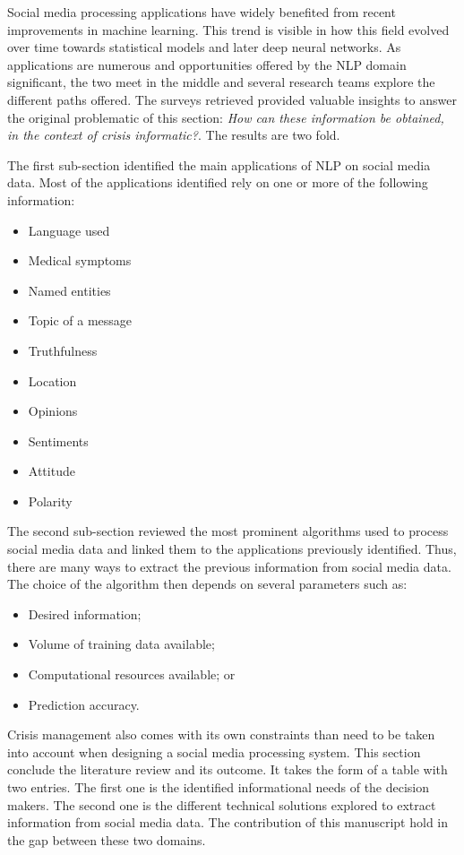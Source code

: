 Social media processing applications have widely benefited from recent improvements in machine learning.
This trend is visible in how this field evolved over time towards statistical models and later deep neural networks.
As applications are numerous and opportunities offered by the NLP domain significant, the two meet in the middle and several research teams explore the different paths offered.
The surveys retrieved provided valuable insights to answer the original problematic of this section: \emph{How can these information be obtained, in the context of crisis informatic?}.
The results are two fold.

The first sub-section identified the main applications of NLP on social media data.
Most of the applications identified rely on one or more of the following information:

\begin{itemize}
    \item Language used
    \item Medical symptoms
    \item Named entities
    \item Topic of a message
    \item Truthfulness
    \item Location
    \item Opinions
    \item Sentiments
    \item Attitude
    \item Polarity
\end{itemize}

The second sub-section reviewed the most prominent algorithms used to process social media data and linked them to the applications previously identified.
Thus, there are many ways to extract the previous information from social media data.
The choice of the algorithm then depends on several parameters such as:

\begin{itemize}
    \item Desired information;
    \item Volume of training data available;
    \item Computational resources available; or
    \item Prediction accuracy.
\end{itemize}

Crisis management also comes with its own constraints than need to be taken into account when designing a social media processing system.
This section conclude the literature review and its outcome.
It takes the form of a table with two entries.
The first one is the identified informational needs of the decision makers.
The second one is the different technical solutions explored to extract information from social media data.
The contribution of this manuscript hold in the gap between these two domains.


